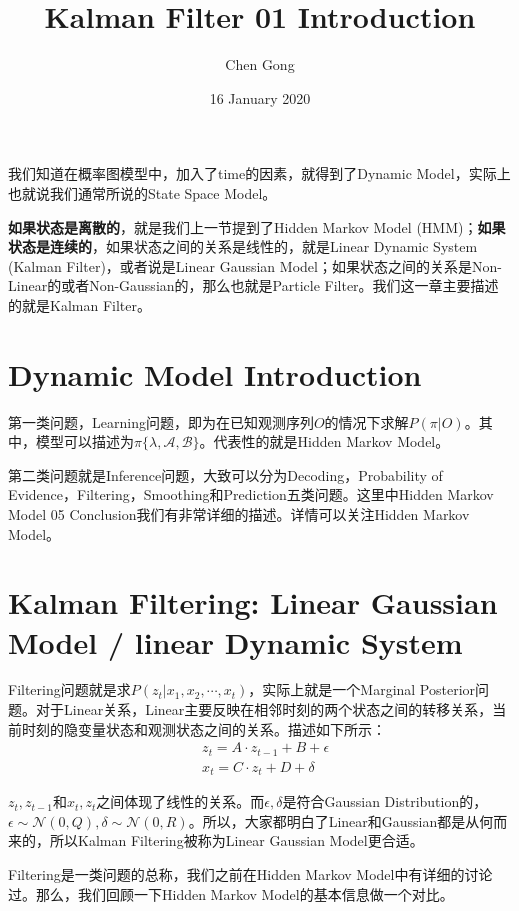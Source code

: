 \documentclass[a4paper]{article}
\title{Kalman Filter 01 Introduction}
\author{Chen Gong}
\date{16 January 2020}
\begin{document}
\maketitle
我们知道在概率图模型中，加入了time的因素，就得到了Dynamic Model，实际上也就说我们通常所说的State Space Model。

\textbf{如果状态是离散的}，就是我们上一节提到了Hidden Markov Model (HMM)；\textbf{如果状态是连续的}，如果状态之间的关系是线性的，就是Linear Dynamic System (Kalman Filter)，或者说是Linear Gaussian Model；如果状态之间的关系是Non-Linear的或者Non-Gaussian的，那么也就是Particle Filter。我们这一章主要描述的就是Kalman Filter。

\section{Dynamic Model Introduction}
第一类问题，Learning问题，即为在已知观测序列$O$的情况下求解$P(\pi|O)$。其中，模型可以描述为$\pi\{ \lambda,\mathcal{A},\mathcal{B} \}$。代表性的就是Hidden Markov Model。

第二类问题就是Inference问题，大致可以分为Decoding，Probability of Evidence，Filtering，Smoothing和Prediction五类问题。这里中Hidden Markov Model 05 Conclusion我们有非常详细的描述。详情可以关注Hidden Markov Model。

\section{Kalman Filtering: Linear Gaussian Model / linear Dynamic System}
Filtering问题就是求$P(z_t|x_1,x_2,\cdots,x_t)$，实际上就是一个Marginal Posterior问题。对于Linear关系，Linear主要反映在相邻时刻的两个状态之间的转移关系，当前时刻的隐变量状态和观测状态之间的关系。描述如下所示：
\begin{equation}
    \begin{split}
        & z_t = A\cdot z_{t-1} + B + \epsilon \\
        & x_t = C\cdot z_{t} + D + \delta
    \end{split}
\end{equation}

$z_t,z_{t-1}$和$x_t,z_t$之间体现了线性的关系。而$\epsilon,\delta$是符合Gaussian Distribution的，$\epsilon \sim \mathcal{N}(0,Q),\delta \sim \mathcal{N}(0,R)$。所以，大家都明白了Linear和Gaussian都是从何而来的，所以Kalman Filtering被称为Linear Gaussian Model更合适。

Filtering是一类问题的总称，我们之前在Hidden Markov Model中有详细的讨论过。那么，我们回顾一下Hidden Markov Model的基本信息做一个对比。
\end{document}
